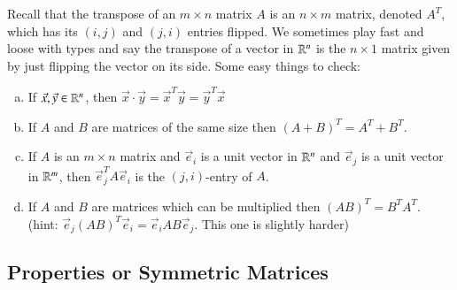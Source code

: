 \documentclass[Main.tex]{subfiles}
\begin{document}
Recall that the transpose of an $m\times n$ matrix $A$ is an $n\times m$ matrix, denoted $A^T$, which has its $(i,j)$ and $(j,i)$ entries flipped.
We sometimes play fast and loose with types and say the transpose of a vector in $\mathbb{R}^n$ is the $n\times 1$ matrix given by just flipping the vector on its side.
Some easy things to check:
\begin{EasyEx}
  \begin{enumerate}[a)]
    \indentitem \item If $\vec{x},\vec{y}\in\mathbb{R}^n$, then $\vec{x}\cdot\vec{y}=\vec{x}^T\vec{y}=\vec{y}^T\vec{x}$
  \item If $A$ and $B$ are matrices of the same size then $(A+B)^T=A^T+B^T$.
  \item If $A$ is an $m\times n$ matrix and $\vec{e}_i$ is a unit vector in $\mathbb{R}^n$ and $\vec{e}_j$ is a unit vector in $\mathbb{R}^m$, then $\vec{e}_j^TA\vec{e}_i$ is the $(j,i)$-entry of $A$.
  \item If $A$ and $B$ are matrices which can be multiplied then $(AB)^T=B^TA^T$.  (hint: $\vec{e}_j(AB)^T\vec{e}_i=\vec{e}_iAB\vec{e}_j$.  This one is slightly harder)
  \end{enumerate}
\end{EasyEx}

\subsection{Properties or Symmetric Matrices}
\end{document}
